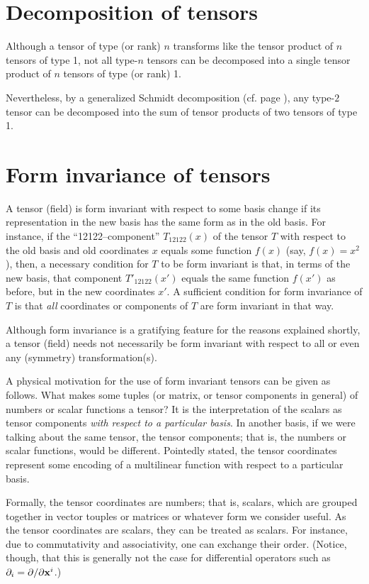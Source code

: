 \section{Decomposition of tensors}

Although a tensor of type (or rank) $n$ transforms like the tensor product of $n$ tensors of type 1,
not all type-$n$ tensors can be decomposed into a single
tensor product of $n$ tensors of type (or rank) 1.

Nevertheless,
by a generalized Schmidt decomposition (cf. page \pageref{2011-m-Schmidtdecomposition}),
any type-$2$ tensor  can be decomposed into
the sum of
tensor products of two tensors of type 1.

\section{Form invariance of tensors}

A tensor (field) is
form invariant  with respect to some basis change
if its representation in the new basis has the same form as in the old basis.
For instance, if the ``12122--component'' $T_{12122} (x)$ of the tensor $T$
with respect to the old basis and old coordinates $x$   equals some function $f(x)$ (say, $f(x)=x^2$),
then, a necessary condition for $T$ to be form invariant is that, in terms of the new basis,
that component  $T'_{12122} (x')$  equals the same function $f(x')$ as before, but in the new coordinates $x'$.
A sufficient condition for form invariance of $T$ is that {\em all}
coordinates or components of $T$ are form invariant in that way.


Although form invariance is a gratifying feature for the reasons explained shortly,
a tensor (field) needs not necessarily
be form invariant with respect to all or even any (symmetry) transformation(s).



A physical motivation for the use of form invariant tensors can be given as follows.
What makes some tuples (or matrix, or tensor components in general)  of
numbers or scalar functions a tensor? It is the
interpretation of the scalars as tensor components {\em with respect to
a particular basis}. In another basis, if we were talking about the same
tensor, the tensor components; that is, the numbers or scalar functions,
would be different.
Pointedly stated, the tensor coordinates represent some
encoding of a multilinear function with respect to a particular basis.

Formally, the tensor coordinates are numbers; that is, scalars,
which are grouped together in vector touples or matrices or whatever form we consider useful.
As the tensor coordinates are scalars, they can be treated as scalars.
For instance, due to commutativity and associativity, one can exchange
their order. (Notice, though, that this is generally not the case for
differential operators such as $\partial_i=\partial / \partial {\bf x}^i$.)


